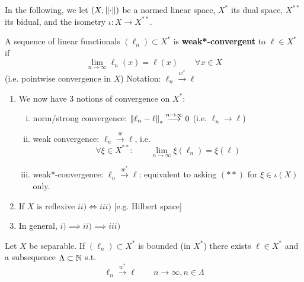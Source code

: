 \documentclass{article}
\begin{document}
In the following, we let $(X, \left\|{\cdot}\right\|)$ be a normed linear space, $X^*$ its dual space, $X^{**}$ its bidual, and the isometry $\iota: X \to X^{**}$.  

\begin{definition}
    A sequence of linear functionals $(\ell_n) \subset X^*$ is \textbf{weak*-convergent} to $\ell \in X^*$ if  
    $$
    \lim_{n\to \infty} \ell_n(x) = \ell(x) \qquad \forall x\in X
    $$
    (i.e. pointwise convergence in $X$) Notation: $\ell_n \overset{w^*}{\longrightarrow} \ell$
\end{definition}  

\begin{remark}
\begin{enumerate}[1)]
    \item We now have 3 notions of convergence on $X^*$:
    \begin{enumerate}[i)]
        \item norm/strong convergence: $\left\|{\ell_n-\ell}\right\|_* \overset{n\to \infty}{\longrightarrow} 0$ (i.e. $\ell_n \to \ell$)
        \item weak convergence: $\ell_n \overset{w}{\longrightarrow} \ell$, i.e.  
        \begin{equation*}
        \forall \xi \in X^{**}: \qquad \lim_{n\to \infty} \xi(\ell_n) = \xi(\ell)    \tag{$**$}
        \end{equation*}
        \item weak*-convergence: $\ell_n \overset{w^*}{\longrightarrow} \ell$: equivalent to asking $(**)$ for $\xi \in \iota(X)$ only. 
    \end{enumerate}
    \item If $X$ is reflexive $ii) \iff iii)$ [e.g. Hilbert space]
    \item In general, $i) \implies ii) \implies iii)$
\end{enumerate}
    
\end{remark}

\begin{theorem}\nl
\label{thm: Banach-Alaoglu}
Let $X$ be separable. If $(\ell_n) \subset X^*$ is bounded (in $X^*$) there exists $\ell\in X^*$ and a subsequence $\Lambda \subset \mathbb{N}$ s.t.  
$$
\ell_n \overset{w^*}{\longrightarrow} \ell \qquad n \to \infty, n\in \Lambda
$$
\end{theorem}
\end{document}
